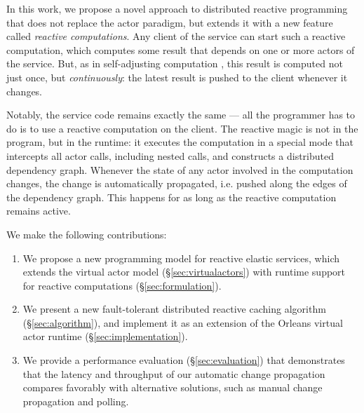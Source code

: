  In this work, we propose a novel approach to distributed reactive programming that does not replace the actor paradigm, but extends it with a new feature called \emph{reactive computations}. Any client of the service can start such a reactive computation, which computes some result that depends on one or more actors of the service. But, as in self-adjusting computation \cite{Acar:SelfAdjustingOverview}, this result is computed not just once, but \emph{continuously}: the latest result is pushed to the client whenever it changes. 

Notably, the service code remains exactly the same ---  all the programmer has to do is to use a reactive computation on the client.  The reactive magic is not in the program, but in the runtime: it executes the computation in a special mode that intercepts all actor calls, including nested calls, and constructs a distributed dependency graph. Whenever the state of any actor involved in the computation changes, the change is automatically propagated, i.e. pushed along the edges of the dependency graph. This happens for as long as the reactive computation remains active. 


 We make the following contributions:
\begin{enumerate}
\item We propose a new programming model for reactive elastic services, which extends the virtual actor model (\S\ref{sec:virtualactors}) with runtime support for reactive computations (\S\ref{sec:formulation}). 
\item We present a new fault-tolerant distributed reactive caching algorithm (\S\ref{sec:algorithm}), and implement it as an extension of the Orleans virtual actor runtime (\S\ref{sec:implementation}).
\item We provide a performance evaluation (\S\ref{sec:evaluation}) that demonstrates that the latency and throughput of our automatic change propagation compares favorably with alternative solutions, such as manual change propagation and polling.
\end{enumerate}    
   
